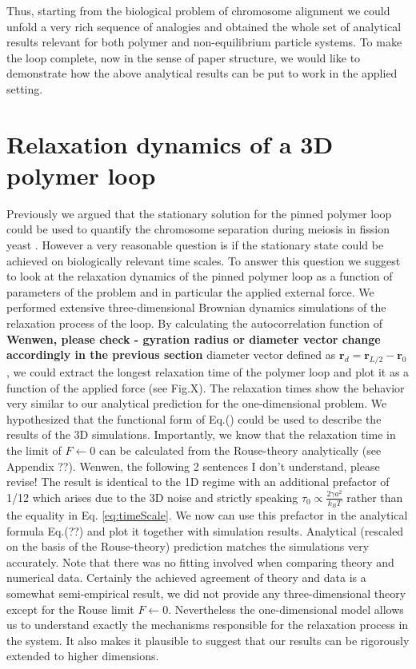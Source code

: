 \documentclass[aps,showpacs,twocolumn,floatfix,prx,superscriptaddress]{revtex4-1}
\begin{document}
Thus, starting from the biological problem of chromosome alignment we could unfold a very rich sequence of analogies and obtained the whole set of analytical results relevant for both polymer and non-equilibrium particle systems. To make the loop complete, now in the sense of paper structure, we would like to demonstrate how the above analytical results can be put to work in the applied setting.


\section{Relaxation dynamics of a 3D polymer loop}
Previously we argued that the stationary solution for the pinned polymer loop could be used to quantify the chromosome separation during meiosis in fission yeast \cite{}. However a very reasonable question is if the stationary state could be achieved on biologically relevant time scales. To answer this question we suggest to look at the relaxation dynamics of the pinned polymer loop as a function of parameters of the problem and in particular the applied external force. We performed extensive three-dimensional Brownian dynamics simulations of the relaxation process of the loop. By calculating the autocorrelation function of {\bf Wenwen, please check - gyration radius or diameter vector change accordingly in the previous section} diameter vector defined as $\mathbf{r}_d = \mathbf{r}_{L/2} - \mathbf{r}_0$, we could extract the longest relaxation time of the polymer loop and plot it as a function of the applied force (see Fig.X). The relaxation times show the behavior very similar to our analytical prediction for the one-dimensional problem. We hypothesized that the functional form of Eq.() could be used to describe the results of the 3D simulations. Importantly, we know that the relaxation time in the limit of $F\leftarrow 0$ can be calculated from the Rouse-theory analytically (see Appendix ??). {Wenwen, the following 2 sentences I don't understand, please revise!} The result is identical to the 1D regime with an additional prefactor of 1/12 which arises due to the 3D noise and strictly speaking $\tau_0\propto\frac{2\gamma a^2}{k_{B}T}$ rather than the equality in Eq. \eqref{eq:timeScale}. We now can use this prefactor in the analytical formula Eq.(??) and plot it together with simulation results. Analytical (rescaled on the basis of the Rouse-theory) prediction matches the simulations very accurately. Note that there was no fitting involved when comparing theory and numerical data. Certainly the achieved agreement of theory and data is a somewhat semi-empirical result, we did not provide any three-dimensional theory except for the Rouse limit $F\leftarrow 0$. Nevertheless the one-dimensional model allows us to understand exactly the mechanisms responsible for the relaxation process in the system. It also makes it plausible to suggest that our results can be rigorously extended to higher dimensions.
\end{document}
